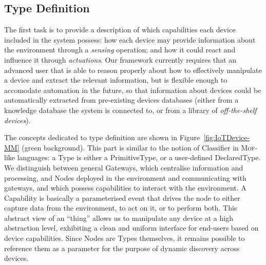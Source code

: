 \subsection{Type Definition}
\label{sec:IoTDSL-TD}

The first task is to provide a description of which capabilities each device included in the \IOT system possess: how each device may provide information about the environment through a \emph{sensing} operation; and how it could react and influence it through \emph{actuations}. Our framework currently requires that an advanced user that is able to reason properly about how to effectively manipulate a device and extract the relevant information, but is flexible enough to accomodate automation in the future, so that information about devices could be automatically extracted from pre-existing devices databases (either from a knowledge database the \IOT system is connected to, or from a library of \emph{off-the-shelf devices}).


The concepts dedicated to type definition are shown in Figure~\ref{fig:IoTDevice-MM} (green background). This part is similar to the notion of \textsf{Classifier} in \textsc{Mof}-like languages: a \textsf{Type} is either a \textsf{PrimitiveType}, or a user-defined \textsf{DeclaredType}. We distinguish between general \textsf{Gateway}s, which centralise information and processing, and \textsf{Node}s deployed in the environment and communicating with gateways, and which possess capabilities to interact with the environment. A \textsf{Capability} is basically a parameterised event that drives the node to either capture data from the environment, to act on it, or to perform both. This abstract view of an ``thing'' allows us to manipulate any device at a high abstraction level, exhibiting a clean and uniform interface for end-users based on device capabilities. Since \textsf{Node}s are \textsf{Type}s themselves, it remains possible to reference them as a parameter for the purpose of dynamic discovery across devices.

